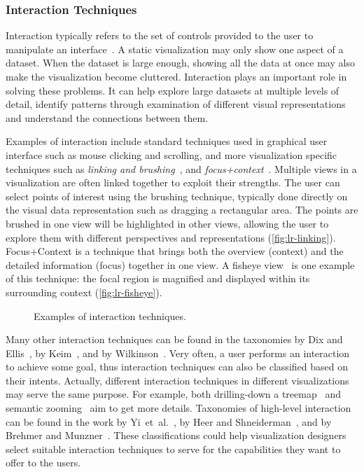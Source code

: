 \subsubsection{Interaction Techniques}
Interaction typically refers to the set of controls provided to the user to manipulate an interface~\cite{Pike2009a}. A static visualization may only show one aspect of a dataset. When the dataset is large enough, showing all the data at once may also make the visualization become cluttered. Interaction plays an important role in solving these problems. It can help explore large datasets at multiple levels of detail, identify patterns through examination of different visual representations and understand the connections between them.

Examples of interaction include standard techniques used in graphical user interface such as mouse clicking and scrolling, and more visualization specific techniques such as \emph{linking and brushing}~\cite{Kosara2003}, and \emph{focus+context}~\cite{Cockburn2008}. Multiple views in a visualization are often linked together to exploit their strengths. The user can select points of interest using the brushing technique, typically done directly on the visual data representation such as dragging a rectangular area. The points are brushed in one view will be highlighted in other views, allowing the user to explore them with different perspectives and representations (\autoref{fig:lr-linking}). Focus+Context is a technique that brings both the overview (context) and the detailed information (focus) together in one view. A fisheye view~\cite{Furnas1986,Furnas2006} is one example of this technique: the focal region is magnified and displayed within its surrounding context (\autoref{fig:lr-fisheye}).

\begin{figure}[!htb]
\centering
{} 
\hfill
{} 
\caption{Examples of interaction techniques.}
\label{fig:lr-interaction}
\end{figure}

Many other interaction techniques can be found in the taxonomies by Dix and Ellis~\cite{Dix1998}, by Keim~\cite{Keim2002}, and by Wilkinson~\cite{Wilkinson2005}. Very often, a user performs an interaction to achieve some goal, thus interaction techniques can also be classified based on their intents. Actually, different interaction techniques in different visualizations may serve the same purpose. For example, both drilling-down a treemap~\cite{Shneiderman1992} and semantic zooming~\cite{Perlin1993} aim to get more details. Taxonomies of high-level interaction can be found in the work by Yi~et~al.~\cite{Yi2007}, by Heer and Shneiderman~\cite{Heer2012}, and by Brehmer and Munzner~\cite{Brehmer2013}. These classifications could help visualization designers select suitable interaction techniques to serve for the capabilities they want to offer to the users.

